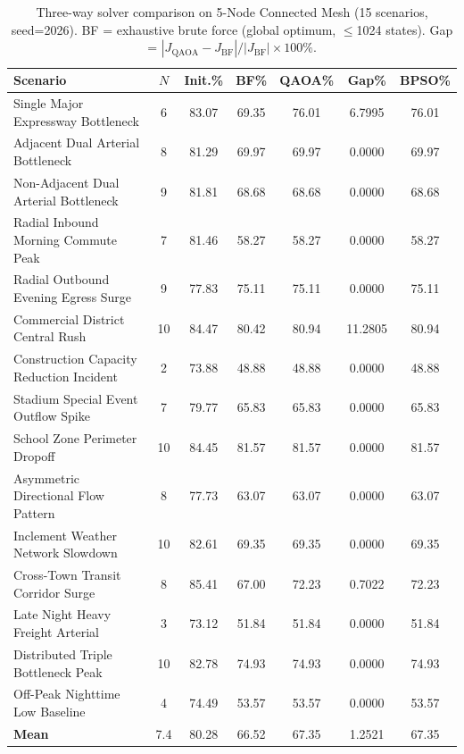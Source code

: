 \begin{table}[h!]
\centering
\caption{Three-way solver comparison on 5-Node Connected Mesh (15 scenarios, seed=2026). BF = exhaustive brute force (global optimum, $\leq$1024 states). Gap = $|J_{\text{QAOA}}-J_{\text{BF}}|/|J_{\text{BF}}|\times100\%$.}
\label{tab:threeway_5node_connected_mesh}
\begin{tabular}{p{5.0cm} c c c c c c}
\toprule
\textbf{Scenario} & $N$ & \textbf{Init.\%} & \textbf{BF\%} & \textbf{QAOA\%} & \textbf{Gap\%} & \textbf{BPSO\%} \\
\midrule
Single Major Expressway Bottleneck & 6 & 83.07 & 69.35 & 76.01 & 6.7995 & 76.01 \\
Adjacent Dual Arterial Bottleneck & 8 & 81.29 & 69.97 & 69.97 & 0.0000 & 69.97 \\
Non-Adjacent Dual Arterial Bottleneck & 9 & 81.81 & 68.68 & 68.68 & 0.0000 & 68.68 \\
Radial Inbound Morning Commute Peak & 7 & 81.46 & 58.27 & 58.27 & 0.0000 & 58.27 \\
Radial Outbound Evening Egress Surge & 9 & 77.83 & 75.11 & 75.11 & 0.0000 & 75.11 \\
Commercial District Central Rush & 10 & 84.47 & 80.42 & 80.94 & 11.2805 & 80.94 \\
Construction Capacity Reduction Incident & 2 & 73.88 & 48.88 & 48.88 & 0.0000 & 48.88 \\
Stadium Special Event Outflow Spike & 7 & 79.77 & 65.83 & 65.83 & 0.0000 & 65.83 \\
School Zone Perimeter Dropoff & 10 & 84.45 & 81.57 & 81.57 & 0.0000 & 81.57 \\
Asymmetric Directional Flow Pattern & 8 & 77.73 & 63.07 & 63.07 & 0.0000 & 63.07 \\
Inclement Weather Network Slowdown & 10 & 82.61 & 69.35 & 69.35 & 0.0000 & 69.35 \\
Cross-Town Transit Corridor Surge & 8 & 85.41 & 67.00 & 72.23 & 0.7022 & 72.23 \\
Late Night Heavy Freight Arterial & 3 & 73.12 & 51.84 & 51.84 & 0.0000 & 51.84 \\
Distributed Triple Bottleneck Peak & 10 & 82.78 & 74.93 & 74.93 & 0.0000 & 74.93 \\
Off-Peak Nighttime Low Baseline & 4 & 74.49 & 53.57 & 53.57 & 0.0000 & 53.57 \\
\midrule
\textbf{Mean} & 7.4 & 80.28 & 66.52 & 67.35 & 1.2521 & 67.35 \\
\bottomrule
\end{tabular}
\end{table}

